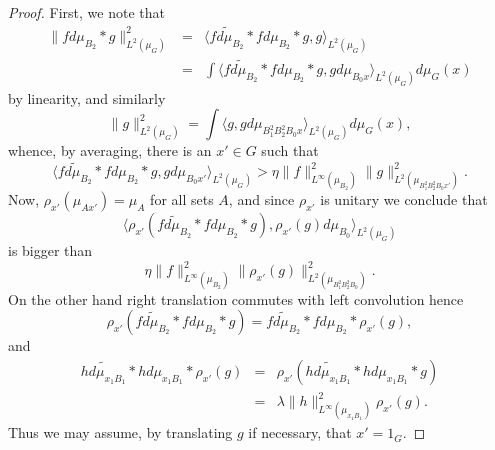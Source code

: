 \documentclass[12pt]{amsart}
\numberwithin{equation}{section}
\theoremstyle{plain}
\theoremstyle{definition}
\begin{document}
\begin{proof}
First, we note that
\begin{eqnarray*}
\|fd\mu_{B_2} \ast g\|_{L^2(\mu_G)}^2&=&\langle \widetilde{fd\mu_{B_2}} \ast fd\mu_{B_2} \ast g,g\rangle_{L^2(\mu_G)}\\ & =&  \int{\langle \widetilde{fd\mu_{B_2}} \ast fd\mu_{B_2} \ast g, gd\mu_{B_0x}\rangle_{L^2(\mu_G)}d\mu_G(x)}
\end{eqnarray*}
by linearity, and similarly
\begin{equation*}
\|g\|_{L^2(\mu_G)}^2=\int{\langle g,gd\mu_{B_1^2B_2^2B_0x}\rangle_{L^2(\mu_G)}d\mu_G(x)},
\end{equation*}
whence, by averaging, there is an $x' \in G$ such that
\begin{equation*}
\langle \widetilde{fd\mu_{B_2}} \ast fd\mu_{B_2} \ast g, gd\mu_{B_0x'}\rangle_{L^2(\mu_G)}> \eta \|f\|_{L^\infty(\mu_{B_2})}^2\|g\|_{L^2(\mu_{B_1^2B_2^2B_0x'})}^2.
\end{equation*}
Now, $\rho_{x'}(\mu_{Ax'}) = \mu_A$ for all sets $A$, and since $\rho_{x'}$ is unitary we conclude that
\begin{equation*}
\langle \rho_{x'}(\widetilde{fd\mu_{B_2}} \ast fd\mu_{B_2} \ast g), \rho_{x'}(g)d\mu_{B_0}\rangle_{L^2(\mu_G)}
\end{equation*}
is bigger than
\begin{equation*}
\eta  \|f\|_{L^\infty(\mu_{B_2})}^2\|\rho_{x'}(g)\|_{L^2(\mu_{B_1^2B_2^2B_0})}^2.
\end{equation*}
On the other hand right translation commutes with left convolution hence
\begin{equation*}
\rho_{x'}(\widetilde{fd\mu_{B_2}} \ast fd\mu_{B_2} \ast g)=\widetilde{fd\mu_{B_2}}\ast fd\mu_{B_2} \ast \rho_{x'}(g),
\end{equation*}
and
\begin{eqnarray*}
\widetilde{hd\mu_{x_1B_1}}\ast hd\mu_{x_1B_1}  \ast \rho_{x'}(g) &=& \rho_{x'}(\widetilde{hd\mu_{x_1B_1}}\ast hd\mu_{x_1B_1}  \ast g)\\& =& \lambda \|h\|_{L^\infty(\mu_{x_1B_1})}^2\rho_{x'}(g).
\end{eqnarray*}
Thus we may assume, by translating $g$ if necessary, that $x'=1_G$.


\end{proof}
\end{document}
